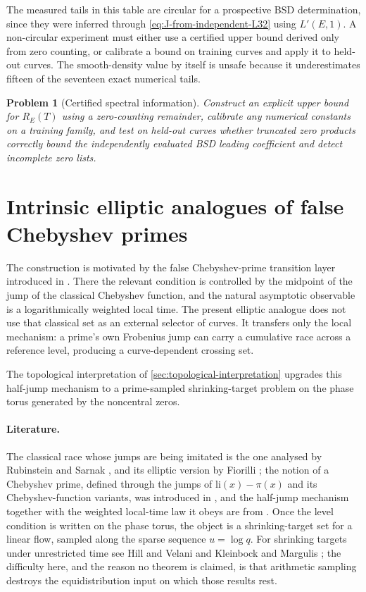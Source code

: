 \documentclass[11pt,reqno]{amsart}
\newtheorem{problem}{Problem}
\theoremstyle{remark}
\begin{document}
The measured tails in this table are circular for a prospective BSD determination, since they were inferred through \eqref{eq:J-from-independent-L32} using $L'(E,1)$.  A non-circular experiment must either use a certified upper bound derived only from zero counting, or calibrate a bound on training curves and apply it to held-out curves.  The smooth-density value by itself is unsafe because it underestimates fifteen of the seventeen exact numerical tails.

\begin{problem}[Certified spectral information]
Construct an explicit upper bound for $R_E(T)$ using a zero-counting remainder, calibrate any numerical constants on a training family, and test on held-out curves whether truncated zero products correctly bound the independently evaluated BSD leading coefficient and detect incomplete zero lists.
\end{problem}

\section{Intrinsic elliptic analogues of false Chebyshev primes}
\label{sec:crossings}

The construction is motivated by the false Chebyshev-prime transition layer introduced in \cite{PlanatFalseCheb2026}.  There the relevant condition is controlled by the midpoint of the jump of the classical Chebyshev function, and the natural asymptotic observable is a logarithmically weighted local time.  The present elliptic analogue does not use that classical set as an external selector of curves.  It transfers only the local mechanism: a prime's own Frobenius jump can carry a cumulative race across a reference level, producing a curve-dependent crossing set.

The topological interpretation of \cref{sec:topological-interpretation} upgrades this half-jump mechanism to a prime-sampled shrinking-target problem on the phase torus generated by the noncentral zeros.

\paragraph{Literature.}
The classical race whose jumps are being imitated is the one analysed by Rubinstein and Sarnak \cite{RubinsteinSarnak1994}, and its elliptic version by Fiorilli \cite{Fiorilli2014}; the notion of a Chebyshev prime, defined through the jumps of $\mathrm{li}(x)-\pi(x)$ and its Chebyshev-function variants, was introduced in \cite{PlanatSole2013}, and the half-jump mechanism together with the weighted local-time law it obeys are from \cite{PlanatFalseCheb2026}.  Once the level condition is written on the phase torus, the object is a shrinking-target set for a linear flow, sampled along the sparse sequence $u=\log q$.  For shrinking targets under unrestricted time see Hill and Velani \cite{HillVelani1995} and Kleinbock and Margulis \cite{KleinbockMargulis1999}; the difficulty here, and the reason no theorem is claimed, is that arithmetic sampling destroys the equidistribution input on which those results rest.
\end{document}
